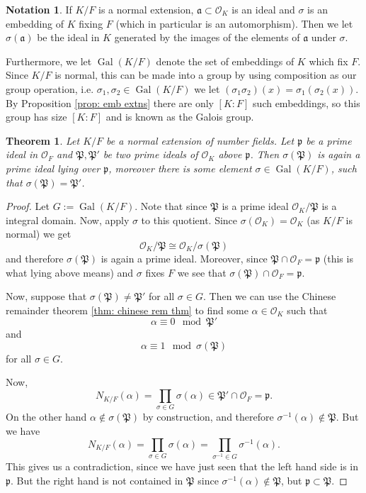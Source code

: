 \documentclass[11pt,a4paper]{report}
\theoremstyle{plain}
\newtheorem{thm}[subsection]{Theorem}
\theoremstyle{definition}
\theoremstyle{definition}
\newtheorem{nota}[subsection]{Notation}
\def \gothP{\mathfrak{P}}
\def\gothp{\mathfrak{p}}
\def \a{\alpha}
\def \s {\sigma}
\def \OO {\mathcal{O}}
\def \s {\sigma}
\def\gotha{\mathfrak{a}}
\DeclareMathOperator{\Gal}{Gal}
\begin{document}
\begin{nota}
	If $K/F$ is a normal extension, $\gotha \subset \OO_K$ is an ideal and $\s$ is an embedding of $K$ fixing $F$ (which in particular is an automorphism). Then we let $\s(\gotha)$ be the ideal in $K$ generated by the images of the elements of $\gotha$ under $\s$. 
	
	Furthermore, we let $\Gal(K/F)$ denote the set of embeddings of $K$ which fix $F$. Since $K/F$ is normal, this can be made into a group by using composition as our group operation, i.e. $\s_1,\s_2 \in \Gal(K/F)$ we let $(\s_1 \s_2)(x)= \s_1(\s_2(x))$. By  Proposition \ref{prop: emb extns} there are only $[K:F]$ such embeddings, so this group has size $[K:F]$ and is known as the Galois group.
\end{nota}





\begin{thm}\label{thm: ideals and embs}
	Let $K/F$ be a normal extension of number fields. Let $\gothp$ be a prime ideal in $\OO_F$ and $\gothP,\gothP'$ be two prime ideals of $\OO_K$ above $\gothp$. Then $\s(\gothP)$ is again a prime ideal lying over $\gothp$, moreover there is some element $\s \in \Gal(K/F)$, such that $\s(\gothP)=\gothP'$.
\end{thm}

\begin{proof}
	Let $G:=\Gal(K/F)$. Note that since $\gothP$ is a prime ideal $\OO_K/\gothP$ is a integral domain. Now, apply $\s$ to this quotient. Since $\s(\OO_K)=\OO_K$ (as $K/F$ is normal) we get \[\OO_K/\gothP \cong \OO_K /\s(\gothP)\] and therefore $\s(\gothP)$ is again a prime ideal. Moreover, since $\gothP \cap \OO_F=\gothp$ (this is what lying above means) and $\s$ fixes $F$ we see that $\s(\gothP) \cap \OO_F=\gothp$. 
	
	
	Now, suppose that $\s(\gothP) \neq \gothP'$ for all $\s \in G$. Then we can use the Chinese remainder theorem \ref{thm: chinese rem thm} to find some $\a \in \OO_K$ such that \[\a \equiv 0 \mod \gothP'\] and \[\a \equiv 1 \mod \s(\gothP)\] for all $\s \in G$.
	
	Now, \[N_{K/F}(\a)=\prod_{\s \in G} \s(\a) \in \gothP' \cap \OO_F=\gothp.\] On the other hand $\a \not \in \s(\gothP)$ by construction, and therefore $\s^{-1}(\a) \not \in \gothP$. But we have \[N_{K/F}(\a)=\prod_{\s \in G} \s(\a)=\prod_{\s^{-1} \in G} \s^{-1}(\a).\] This gives us a contradiction, since we have just seen that the left hand side is in $\gothp$. But the right hand  is not contained in $\gothP$ since  $\s^{-1}(\a) \not \in \gothP$, but $\gothp \subset \gothP$. 
	
	
\end{proof}
\end{document}
